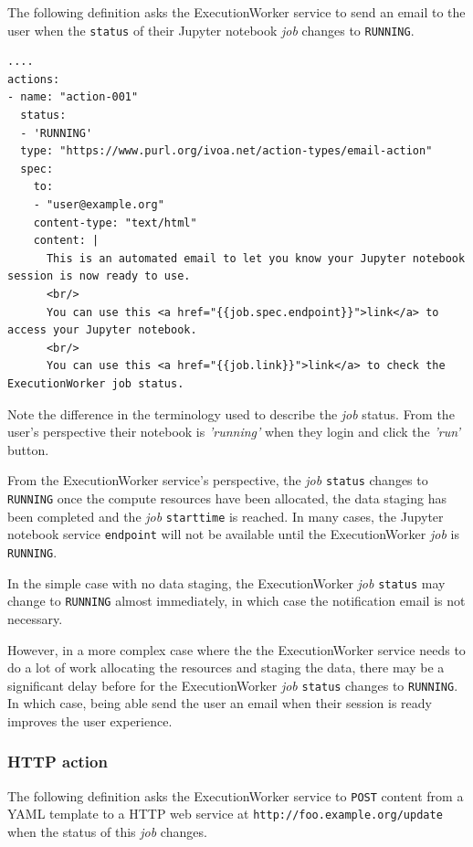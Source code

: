 \documentclass[11pt,a4paper]{ivoa}
\newcommand{\yaml} {YAML}
\newcommand{\webservice} {web service}
\newcommand{\execworkerclass} {ExecutionWorker}
\newcommand{\jupyternotebook} {Jupyter notebook}
\newcommand{\codeword}[1] {\texttt{#1}}
\newcommand{\job} {\textit{job}}
\begin{document}
The following definition asks the \execworkerclass{} service to send an email to the user
when the \codeword{status} of their \jupyternotebook{} \job{} changes to \codeword{RUNNING}.

\begin{lstlisting}[]
....
actions:
- name: "action-001"
  status:
  - 'RUNNING'
  type: "https://www.purl.org/ivoa.net/action-types/email-action"
  spec:
    to:
    - "user@example.org"
    content-type: "text/html"
    content: |
      This is an automated email to let you know your Jupyter notebook session is now ready to use.
      <br/>
      You can use this <a href="{{job.spec.endpoint}}">link</a> to access your Jupyter notebook.
      <br/>
      You can use this <a href="{{job.link}}">link</a> to check the ExecutionWorker job status.
\end{lstlisting}

Note the difference in the terminology used to describe the \job{} status.
From the user's perspective their notebook is \textit{'running'} when they login and click the
\textit{'run'} button.

From the \execworkerclass{} service's perspective, the \job{} \codeword{status} changes to \codeword{RUNNING}
once the compute resources have been allocated, the data staging has been completed
and the \job{} \codeword{starttime} is reached.
In many cases, the \jupyternotebook{} service \codeword{endpoint} will not be available until the
\execworkerclass{} \job{} is \codeword{RUNNING}.

In the simple case with no data staging, the \execworkerclass{} \job{} \codeword{status} may change to
\codeword{RUNNING} almost immediately, in which case the notification email is not necessary.

However, in a more complex case where the the \execworkerclass{} service needs to do a lot of work
allocating the resources and staging the data, there may be a significant delay before for the
\execworkerclass{} \job{} \codeword{status} changes to \codeword{RUNNING}.
In which case, being able send the user an email when their session
is ready improves the user experience.

\subsubsection{HTTP action}
\label{http-action}

The following definition asks the \execworkerclass{} service to \codeword{POST} content from a \yaml{} template
to a HTTP \webservice{} at \codeword{http://foo.example.org/update} when the status of this \job{} changes.
\end{document}
